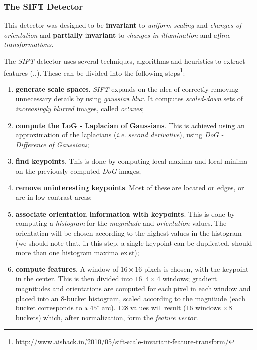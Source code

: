 \documentclass[a4paper,onecolumn,oneside,titlepage,11pt]{report}
\begin{document}
\subsubsection{The SIFT Detector}
This detector was designed to be \textbf{invariant} to \emph{uniform scaling} and \emph{changes of orientation} and \textbf{partially invariant} to \emph{changes in illumination} and \emph{affine transformations}.

The \emph{SIFT} detector uses several techniques, algorithms and heuristics to extract features (\cite{sift1},\cite{sift2},\cite{sift3}). These can be divided into the following steps\footnote{http://www.aishack.in/2010/05/sift-scale-invariant-feature-transform/}:
\begin{enumerate}
	\item \textbf{generate scale spaces}. \emph{SIFT} expands on the idea of correctly removing unnecessary details by using \emph{gaussian blur}. It computes \emph{scaled-down} sets of \emph{increasingly blurred} images, called \emph{octaves};
	\item \textbf{compute the LoG - Laplacian of Gaussians}. This is achieved using an approximation of the laplacians (\emph{i.e. second derivative}), using \emph{DoG - Difference of Gaussians};
	\item \textbf{find keypoints}. This is done by computing local maxima and local minima on the previously computed \emph{DoG} images;
	\item \textbf{remove uninteresting keypoints}. Most of these are located on edges, or are in low-contrast areas;
	\item \textbf{associate orientation information with keypoints}. This is done by computing a \emph{histogram} for the \emph{magnitude} and \emph{orientation} values. The orientation will be chosen according to the highest values in the histogram (we should note that, in this step, a single keypoint can be duplicated, should more than one histogram maxima exist);
	\item \textbf{compute features}. A window of $16\times16$ pixels is chosen, with the keypoint in the center. This is then divided into $16$\ $4\times4$ windows; gradient magnitudes and orientations are computed for each pixel in each window and placed into an 8-bucket histogram, scaled according to the magnitude (each bucket corresponds to a $45^\circ$ arc). 128 values will result ($16$ windows $\times 8$ buckets) which, after normalization, form the \emph{feature vector}.
\end{enumerate}
\end{document}
